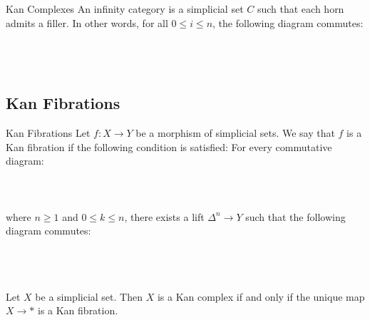 \documentclass[a4paper]{article}
\begin{document}
\begin{defn}{Kan Complexes}{} An infinity category is a simplicial set $C$ such that each horn admits a filler. In other words, for all $0\leq i\leq n$, the following diagram commutes: \\~\\
\\~\\
\end{defn}

\subsection{Kan Fibrations}
\begin{defn}{Kan Fibrations}{} Let $f:X\to Y$ be a morphism of simplicial sets. We say that $f$ is a Kan fibration if the following condition is satisfied: For every commutative diagram: \\~\\
\\~\\
where $n\geq 1$ and $0\leq k\leq n$, there exists a lift $\Delta^n\to Y$ such that the following diagram commutes: \\~\\
\\~\\
\end{defn}

\begin{lmm}{}{} Let $X$ be a simplicial set. Then $X$ is a Kan complex if and only if the unique map $X\to\ast$ is a Kan fibration. 
\end{lmm}
\end{document}
